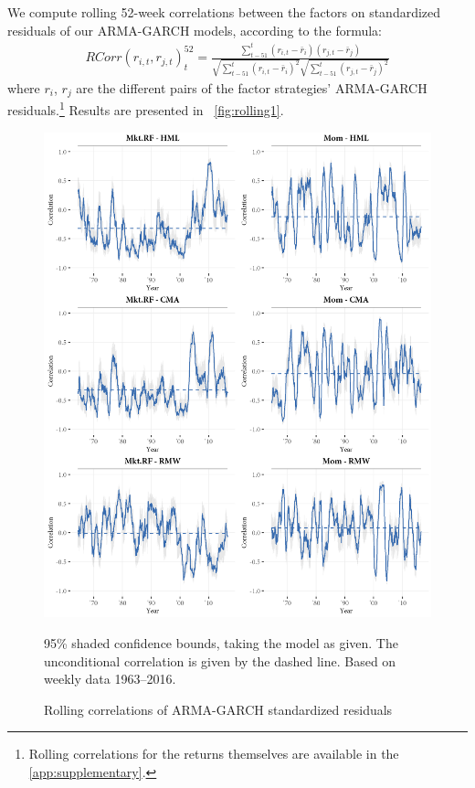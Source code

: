 We compute rolling 52-week correlations between the factors on standardized residuals of our ARMA-GARCH models, according to the formula: 
\begin{align}
    RCorr(r_{i, t}, r_{j, t})_t^{52} = \frac{\sum^{t}_{t-51}(r_{i, t} - \bar{r}_i)(r_{j,t} - \bar{r}_j)}{\sqrt{\sum^{t}_{t-51} (r_{i,t} - \bar{r}_i)^2} \sqrt{\sum^{t}_{t-51} (r_{j,t} - \bar{r}_j)^2}}
\end{align}
where $r_i$, $r_j$ are the different pairs of the factor strategies' ARMA-GARCH residuals.\footnote{Rolling correlations for the returns themselves are available in the \autoref{app:supplementary}.} Results are presented in ~\autoref{fig:rolling1}.
\begin{figure}[!p]
  \centering
  \includegraphics[scale=1]{graphics/rolling1.png}
  \footnotesize
  \caption{Rolling correlations of ARMA-GARCH standardized residuals}
  \begin{longcaption}
    95\% shaded confidence bounds, taking the model as given. The unconditional correlation is given by the dashed line. Based on weekly data 1963--2016.
  \end{longcaption}
  \label{fig:rolling1}
\end{figure}
